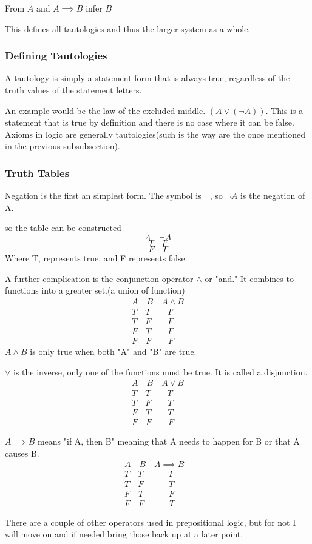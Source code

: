 From $A$ and $A \implies B $ infer $B$

This defines all tautologies and thus the larger system as a whole.
\subsubsection{Defining Tautologies}
A tautology is simply a statement form that is always true, regardless of the truth values of the statement letters.

An example would be the law of the excluded middle. $(A \lor (\neg A))$. This is a statement that is true by definition and there is no case where
it can be false. Axioms in logic are generally tautologies(such is the way are the once mentioned in the previous subsubsection).
\subsubsection{Truth Tables}
Negation is the first an simplest form. The symbol is $\neg$, so $\neg A$ is the negation of A.

so the table can be constructed
$$A \quad \neg A$$
$$T \quad F$$
$$F \quad T$$
Where T, represents true, and F represents false.

A further complication is the conjunction operator $\land $ or "and." It combines to functions into a greater set.(a union of function)
\begin{align*}
    A \quad B \quad A\land B \\
    T \quad T \quad \quad T \quad \\
    T \quad F \quad \quad F \quad \\
    F \quad T \quad \quad F \quad \\
    F \quad F \quad \quad F \quad
\end{align*}
$A \land B$ is only true when both "A" and "B" are true.

$\lor$ is the inverse, only one of the functions must be true. It is called a disjunction. 
\begin{align*}
    A \quad B \quad A\lor B \\
    T \quad T \quad \quad T \quad \\
    T \quad F \quad \quad T \quad \\
    F \quad T \quad \quad T \quad \\
    F \quad F \quad \quad F \quad
\end{align*}

$A \implies B$ means "if A, then B" meaning that A needs to happen for B or that A causes B.
\begin{align*}
    A \quad B \quad A\implies B \\
    T \quad T \quad \quad \quad T \quad \quad  \\
    T \quad F \quad \quad \quad T\quad \quad \\
    F \quad T \quad \quad \quad  F \quad \quad \\
    F \quad F \quad \quad \quad  T \quad \quad
\end{align*}

There are a couple of other operators used in prepositional logic, but for not I will move on and if needed bring those back up at a later point.
